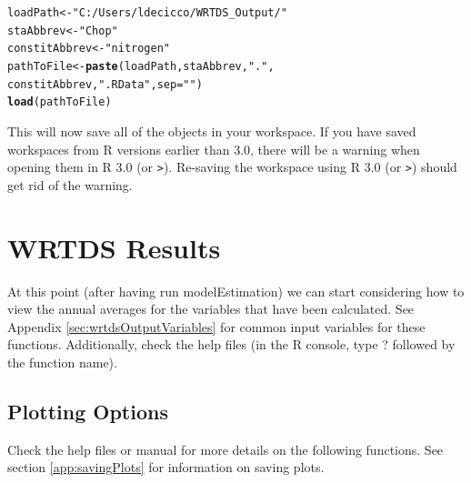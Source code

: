 \documentclass[a4paper,11pt]{article}\usepackage[]{graphicx}\usepackage[]{color}
\makeatletter
\newcommand{\hlstr}[1]{\textcolor[rgb]{0.192,0.494,0.8}{#1}}%
\newcommand{\hlstd}[1]{\textcolor[rgb]{0.345,0.345,0.345}{#1}}%
\newcommand{\hlkwb}[1]{\textcolor[rgb]{0.69,0.353,0.396}{#1}}%
\newcommand{\hlkwc}[1]{\textcolor[rgb]{0.333,0.667,0.333}{#1}}%
\newcommand{\hlkwd}[1]{\textcolor[rgb]{0.737,0.353,0.396}{\textbf{#1}}}%
\newenvironment{kframe}{%
 \def\at@end@of@kframe{}%
 \ifinner\ifhmode%
  \def\at@end@of@kframe{\end{minipage}}%
  \begin{minipage}{\columnwidth}%
 \fi\fi%
 \def\FrameCommand##1{\hskip\@totalleftmargin \hskip-\fboxsep
 \colorbox{shadecolor}{##1}\hskip-\fboxsep
     \hskip-\linewidth \hskip-\@totalleftmargin \hskip\columnwidth}%
 \MakeFramed {\advance\hsize-\width
   \@totalleftmargin\z@ \linewidth\hsize
   \@setminipage}}%
 {\par\unskip\endMakeFramed%
 \at@end@of@kframe}
\newenvironment{knitrout}{}{} %
\makeatother
\begin{document}
\begin{knitrout}
\color{fgcolor}\begin{kframe}
\begin{alltt}
\hlstd{loadPath} \hlkwb{<-} \hlstr{"C:/Users/ldecicco/WRTDS_Output/"}
\hlstd{staAbbrev} \hlkwb{<-} \hlstr{"Chop"}
\hlstd{constitAbbrev} \hlkwb{<-} \hlstr{"nitrogen"}
\hlstd{pathToFile} \hlkwb{<-} \hlkwd{paste}\hlstd{(loadPath,staAbbrev,}\hlstr{"."}\hlstd{,}
                    \hlstd{constitAbbrev,}\hlstr{".RData"}\hlstd{,}\hlkwc{sep}\hlstd{=}\hlstr{""}\hlstd{)}
\hlkwd{load}\hlstd{(pathToFile)}
\end{alltt}
\end{kframe}
\end{knitrout}


This will now save all of the objects in your workspace. If you have saved workspaces from R versions earlier than 3.0, there will be a warning when opening them in R 3.0 (or \verb|>|). Re-saving the workspace using R 3.0 (or \verb|>|) should get rid of the warning.


\FloatBarrier

\section{WRTDS Results}
\label{sec:wrtdsResults}
At this point (after having run modelEstimation) we can start considering how to view the annual averages for the variables that have been calculated.  See Appendix \ref{sec:wrtdsOutputVariables} for common input variables for these functions. Additionally, check the help files (in the R console, type ? followed by the function name).

\subsection{Plotting Options}
\label{sec:wrtdsPlotting}

\FloatBarrier

Check the help files or manual for more details on the following functions.  See section \ref{app:savingPlots} for information on saving plots.
\end{document}
